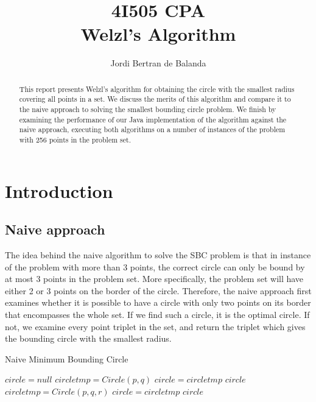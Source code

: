 \documentclass{article}
\title{4I505 CPA\\Welzl's Algorithm}
\author{Jordi Bertran de Balanda}
\begin{document}
\maketitle
\begin{abstract}
  This report presents Welzl's algorithm for obtaining the circle with the smallest radius covering all points in a set. We discuss the merits of this algorithm and compare it to the naive approach to solving the smallest bounding circle problem. We finish by examining the performance of our Java implementation of the algorithm against the naive approach, executing both algorithms on a number of instances of the problem with 256 points in the problem set.
\end{abstract}
\section{Introduction}
\subsection{Naive approach}
The idea behind the naive algorithm to solve the SBC problem is that in instance of the problem with more than 3 points, the correct circle can only be bound by at most 3 points in the problem set. More specifically, the problem set will have either 2 or 3 points on the border of the circle. Therefore, the naive approach first examines whether it is possible to have a circle with only two points on its border that encompasses the whole set. If we find such a circle, it is the optimal circle. If not, we examine every point triplet in the set, and return the triplet which gives the bounding circle with the smallest radius.

\begin{algorithm}
  \caption{Naive Minimum Bounding Circle}
  \begin{algorithmic}[1]
    \State $circle = null$
    \State $circletmp = Circle(p, q)$
    \State $circle = circletmp$
    \EndIf
    \EndFor
    \EndFor
    \Return $circle$
    \EndIf
    \State $circletmp = Circle(p, q, r)$
    \State $circle = circletmp$
    \EndIf
    \EndFor
    \EndFor
    \EndFor
    \State \Return $circle$
    \EndFunction
  \end{algorithmic}
\end{algorithm}
\end{document}
